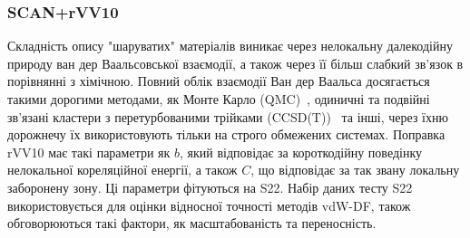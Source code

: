 \subsubsection{SCAN+rVV10}
Складність опису "шаруватих" матеріалів виникає через нелокальну далекодійну природу ван дер Ваальсовської взаємодії, а також через її більш слабкий зв'язок в порівнянні з хімічною. Повний облік взаємодії Ван дер Ваальса досягається такими дорогими методами, як Монте Карло (QMC)~\cite{QMC}, одиничні та подвійні зв'язані кластери з перетурбованими трійками (CCSD(T))~\cite{CCSD(T)} та інші, через їхню дорожнечу їх використовують тільки на строго обмежених системах. Поправка rVV10 має такі параметри як $b$, який відповідає за короткодійну поведінку нелокальної кореляційної енергії, а також $C$, що відповідає за так звану локальну заборонену зону. Ці параметри фітуються на S22. Набір даних тесту S22~\cite{S22} використовується для оцінки відносної точності методів vdW-DF, також обговорюються такі фактори, як масштабованість та переносність.